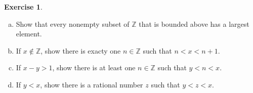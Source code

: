 \documentclass[11pt,a4paper,twoside]{article}
\theoremstyle{definition}
\newcounter{excounter}
\newtheorem{exercise}[excounter]{Exercise}
\begin{document}
\begin{exercise}\hfill

  \begin{enumerate}[(a)]

  \item Show that every nonempty subset of $\mathbb{Z}$ that is bounded above has a largest element.
  \item If $x \notin \mathbb{Z}$, show there is exacty one $n \in \mathbb{Z}$ such that $n < x < n + 1$.
  \item If $x - y > 1$, show there is at least one $n \in \mathbb{Z}$ such that $y < n < x$.
  \item If $y < x$, show there is a rational number $z$ such that $y < z < x$.

  \end{enumerate}

\end{exercise}
\end{document}
